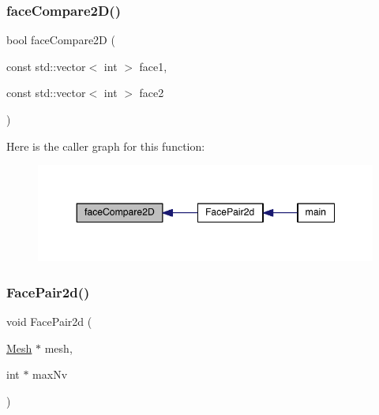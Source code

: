 \subsubsection{\texorpdfstring{face\+Compare2\+D()}{faceCompare2D()}}
{\footnotesize\ttfamily bool face\+Compare2D (\begin{DoxyParamCaption}\item[{const std\+::vector$<$ int $>$}]{face1,  }\item[{const std\+::vector$<$ int $>$}]{face2 }\end{DoxyParamCaption})}

Here is the caller graph for this function\+:\nopagebreak
\begin{figure}[H]
\begin{center}
\leavevmode
\includegraphics[width=348pt]{a00578_a47244e0c661b3f7b5dde22b312884021_icgraph}
\end{center}
\end{figure}
\mbox{\label{a00578_a73ad96b82acf2bf80fd24823a58b3f14}} 
\subsubsection{\texorpdfstring{Face\+Pair2d()}{FacePair2d()}}
{\footnotesize\ttfamily void Face\+Pair2d (\begin{DoxyParamCaption}\item[{\hyperlink{a00557_aeffbe0891ab73a4d8964c9cb7978426e}{Mesh} $\ast$}]{mesh,  }\item[{int $\ast$}]{max\+Nv }\end{DoxyParamCaption})}

